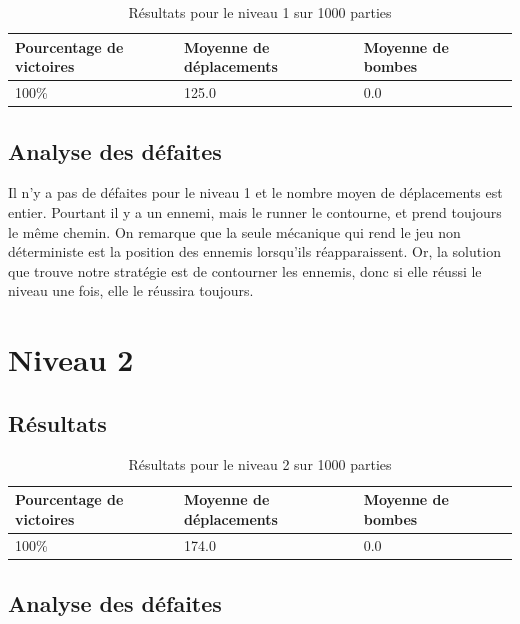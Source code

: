 \begin{table}[!htpb]
    \begin{tabularx}{\textwidth}{lXXX}
        \toprule
        Pourcentage de victoires & Moyenne de déplacements & Moyenne de bombes \\
        \midrule
        100\% & 125.0 & 0.0 \\
        \bottomrule
    \end{tabularx}
    \caption{Résultats pour le niveau 1 sur 1000 parties}
    \label{tab:res-niveau-1}
\end{table}

\subsection{Analyse des défaites}

Il n'y a pas de défaites pour le niveau 1 et le nombre moyen de déplacements est entier.
Pourtant il y a un ennemi, mais le runner le contourne, et prend toujours le même chemin.
\newline
On remarque que la seule mécanique qui rend le jeu non déterministe est la position des ennemis lorsqu'ils réapparaissent.
Or, la solution que trouve notre stratégie est de contourner les ennemis, donc si elle réussi le niveau une fois, elle le réussira toujours.

\section{Niveau 2}

\subsection{Résultats}

\begin{table}[!htpb]
    \begin{tabularx}{\textwidth}{lXXX}
        \toprule
        Pourcentage de victoires & Moyenne de déplacements & Moyenne de bombes \\
        \midrule
        100\% & 174.0 & 0.0 \\
        \bottomrule
    \end{tabularx}
    \caption{Résultats pour le niveau 2 sur 1000 parties}
    \label{tab:res-niveau-2}
\end{table}

\subsection{Analyse des défaites}


